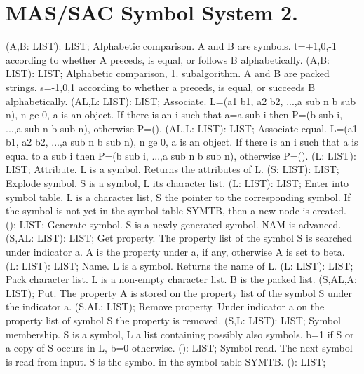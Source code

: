 \section{ MAS/SAC Symbol System 2. } 
 (A,B: LIST): LIST; \eproc
\bcom Alphabetic comparison. A and B are symbols. t=+1,0,-1 according
to whether A preceds, is equal, or follows B alphabetically. \ecom 
{} (A,B: LIST): LIST; \eproc
\bcom Alphabetic comparison, 1. subalgorithm. A and B are packed strings.
s=-1,0,1 according to whether a preceds, is equal, or succeeds B
alphabetically. \ecom 
{} (AL,L: LIST): LIST; \eproc
\bcom Associate. L=(a1 b1, a2 b2, ...,a sub n b sub n), n ge 0,
a is an object. If there is an i such that a=a sub i then
P=(b sub i, ...,a sub n b sub n), otherwise P=(). \ecom 
{} (AL,L: LIST): LIST; \eproc
\bcom Associate equal. L=(a1 b1, a2 b2, ...,a sub n b sub n), n ge 0,
a is an object. If there is an i such that a is equal to a sub i then
P=(b sub i, ...,a sub n b sub n), otherwise P=(). \ecom 
{} (L: LIST): LIST; \eproc
\bcom Attribute. L is a symbol. Returns the attributes of L. \ecom 
{} (S: LIST): LIST; \eproc
\bcom Explode symbol. S is a symbol, L its character list. \ecom 
{} (L: LIST): LIST; \eproc
\bcom Enter into symbol table. L is a character list, S the pointer
to the corresponding symbol. If the symbol is not yet in the
symbol table SYMTB, then a new node is created. \ecom 
{} (): LIST; \eproc
\bcom Generate symbol. S is a newly generated symbol. NAM is advanced. \ecom 
{} (S,AL: LIST): LIST; \eproc
\bcom Get property. The property list of the symbol S is searched
under indicator a. A is the property under a, if any, otherwise
A is set to beta. \ecom 
{} (L: LIST): LIST; \eproc
\bcom Name. L is a symbol. Returns the name of L. \ecom 
{} (L: LIST): LIST; \eproc
\bcom Pack character list. L is a non-empty character list. B is the
packed list. \ecom 
{} (S,AL,A: LIST); \eproc
\bcom Put. The property A is stored on the property list of
the symbol S under the indicator a. \ecom 
{} (S,AL: LIST); \eproc
\bcom Remove property. Under indicator a on the property list of
symbol S the property is removed. \ecom 
{} (S,L: LIST): LIST; \eproc
\bcom Symbol membership. S is a symbol, L a list containing possibly
also symbols. b=1 if S or a copy of S occurs in L, b=0 otherwise. \ecom 
{} (): LIST; \eproc
\bcom Symbol read. The next symbol is read from input. S is the symbol in
the symbol table SYMTB. \ecom 
{} (): LIST; \eproc
